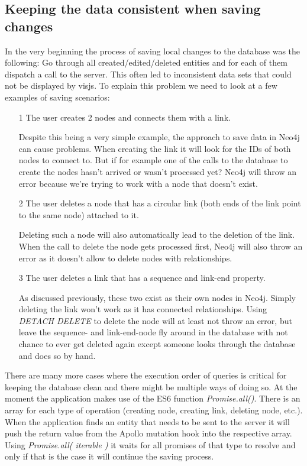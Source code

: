 \subsection{Keeping the data consistent when saving changes}
In the very beginning the process of saving local changes to the database was the following: Go through all created/edited/deleted entities and for each of them dispatch a call to the server. This often led to inconsistent data sets that could not be displayed by visjs. To explain this problem we need to look at a few examples of saving scenarios:
\begin{itemize}
\item[1] The user creates 2 nodes and connects them with a link.

Despite this being a very simple example, the approach to save data in Neo4j can cause problems. When creating the link it will look for the IDs of both nodes to connect to. But if for example one of the calls to the database to create the nodes hasn't arrived or wasn't processed yet? Neo4j will throw an error because we're trying to work with a node that doesn't exist.

\item[2] The user deletes a node that has a circular link (both ends of the link point to the same node) attached to it.

Deleting such a node will also automatically lead to the deletion of the link. When the call to delete the node gets processed first, Neo4j will also throw an error as it doesn't allow to delete nodes with relationships.

\item[3] The user deletes a link that has a sequence and link-end property.

As discussed previously, these two exist as their own nodes in Neo4j. Simply deleting the link won't work as it has connected relationships. Using \emph{DETACH DELETE} to delete the node will at least not throw an error, but leave the sequence- and link-end-node fly around in the database with not chance to ever get deleted again except someone looks through the database and does so by hand.
\end{itemize}

There are many more cases where the execution order of queries is critical for keeping the database clean and there might be multiple ways of doing so. At the moment the application makes use of the ES6 function \emph{Promise.all()}. There is an array for each type of operation (creating node, creating link, deleting node, etc.). When the application finds an entity that needs to be sent to the server it will push the return value from the Apollo mutation hook into the respective array. Using \emph{Promise.all( iterable )} it waits for all promises of that type to resolve and only if that is the case it will continue the saving process.

